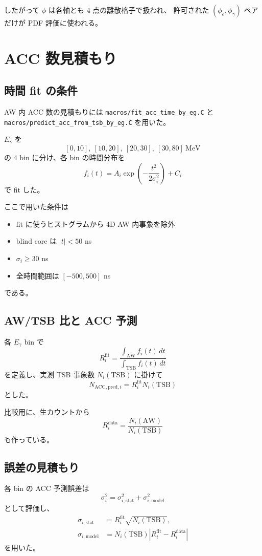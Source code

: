 \documentclass[a4paper,11pt]{jsarticle}
\begin{document}
したがって \(\phi\) は各軸とも 4 点の離散格子で扱われ、
許可された \((\phi_e,\phi_\gamma)\) ペアだけが PDF 評価に使われる。

\section{ACC 数見積もり}
\subsection{時間 fit の条件}
AW 内 ACC 数の見積もりには
\texttt{macros/fit\_acc\_time\_by\_eg.C} と
\texttt{macros/predict\_acc\_from\_tsb\_by\_eg.C}
を用いた。

\(E_\gamma\) を
\[
[0,10],\ [10,20],\ [20,30],\ [30,80]\ \mathrm{MeV}
\]
の 4 bin に分け、各 bin の時間分布を
\begin{equation}
f_i(t)=A_i\exp\left(-\frac{t^2}{2\sigma_i^2}\right)+C_i
\end{equation}
で fit した。

ここで用いた条件は
\begin{itemize}
  \item fit に使うヒストグラムから 4D AW 内事象を除外
  \item blind core は \(|t|<50\) ns
  \item \(\sigma_i \ge 30\) ns
  \item 全時間範囲は \([-500,500]\) ns
\end{itemize}
である。

\subsection{AW/TSB 比と ACC 予測}
各 \(E_\gamma\) bin で
\begin{equation}
R_i^{\mathrm{fit}}=
\frac{\int_{\mathrm{AW}} f_i(t)\,dt}
{\int_{\mathrm{TSB}} f_i(t)\,dt}
\end{equation}
を定義し、実測 TSB 事象数 \(N_i(\mathrm{TSB})\) に掛けて
\begin{equation}
N_{\mathrm{ACC,pred},i}=R_i^{\mathrm{fit}}N_i(\mathrm{TSB})
\end{equation}
とした。

比較用に、生カウントから
\[
R_i^{\mathrm{data}} = \frac{N_i(\mathrm{AW})}{N_i(\mathrm{TSB})}
\]
も作っている。

\subsection{誤差の見積もり}
各 bin の ACC 予測誤差は
\begin{equation}
\sigma_i^2 = \sigma_{i,\mathrm{stat}}^2 + \sigma_{i,\mathrm{model}}^2
\end{equation}
として評価し、
\begin{align}
\sigma_{i,\mathrm{stat}} &= R_i^{\mathrm{fit}}\sqrt{N_i(\mathrm{TSB})},\\
\sigma_{i,\mathrm{model}} &= N_i(\mathrm{TSB})\left|R_i^{\mathrm{fit}}-R_i^{\mathrm{data}}\right|
\end{align}
を用いた。
\end{document}
